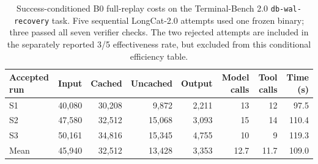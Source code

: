 \begin{table}[t]
    \centering
    \small
    \begin{tabular}{lrrrrrrr}
        \toprule
        Accepted run & Input & Cached & Uncached & Output & Model calls & Tool calls & Time (s) \\
        \midrule
        S1 & 40,080 & 30,208 & 9,872 & 2,211 & 13 & 12 & 97.5 \\
        S2 & 47,580 & 32,512 & 15,068 & 3,093 & 15 & 14 & 110.4 \\
        S3 & 50,161 & 34,816 & 15,345 & 4,755 & 10 & 9 & 119.3 \\
        \midrule
        Mean & 45,940 & 32,512 & 13,428 & 3,353 & 12.7 & 11.7 & 109.0 \\
        \bottomrule
    \end{tabular}
    \caption{Success-conditioned B0 full-replay costs on the
    Terminal-Bench 2.0 \texttt{db-wal-recovery} task. Five sequential
    LongCat-2.0 attempts used one frozen binary; three passed all seven
    verifier checks. The two rejected attempts are included in the
    separately reported 3/5 effectiveness rate, but excluded from this
    conditional efficiency table.}
    \label{tab:b0-wal-baseline}
\end{table}
